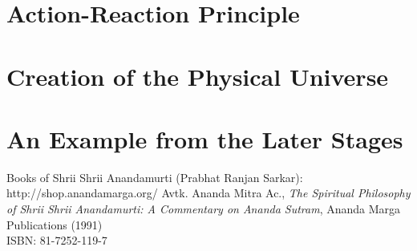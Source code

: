 \documentclass[12pt,a4j,draft]{jarticle}
\numberwithin{equation}{section}
\theoremstyle{break}
\begin{document}
\section{Action-Reaction Principle}
%
\newpage
\section{Creation of the Physical Universe}
%
\section{An Example from the Later Stages}
%
\newpage
\begin{thebibliography}{99}
Books of Shrii Shrii Anandamurti (Prabhat Ranjan Sarkar): \\
http://shop.anandamarga.org/
Avtk. Ananda Mitra Ac., \emph{The Spiritual Philosophy of Shrii Shrii Anandamurti: A Commentary on Ananda Sutram}, Ananda Marga Publications (1991) \\
ISBN: 81-7252-119-7
\end{thebibliography}
\end{document}
